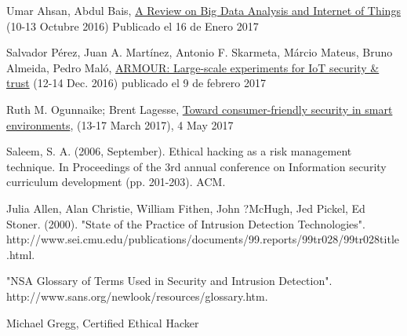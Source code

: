 \documentclass[a4paper,english,11pt]{article}
\begin{document}
\begin{thebibliography}{9}
		Umar Ahsan, Abdul Bais, \href{http://ieeexplore.ieee.org/stamp/stamp.jsp?arnumber=7815042&tag=1}{A Review on Big Data Analysis and Internet of Things} (10-13 Octubre 2016) Publicado el 16 de Enero 2017
		
		Salvador Pérez, Juan A. Martínez, Antonio F. Skarmeta, Márcio Mateus, Bruno Almeida, Pedro Maló, \href{http://ieeexplore.ieee.org/document/7845504/}{ARMOUR: Large-scale experiments for IoT security \& trust}
		(12-14 Dec. 2016) publicado el 9 de febrero 2017
		
		Ruth M. Ogunnaike; Brent Lagesse, \href{http://ieeexplore.ieee.org/document/7917633/}{Toward consumer-friendly security in smart environments}, (13-17 March 2017), 4 May 2017
		
		Saleem, S. A. (2006, September). Ethical hacking as a risk management technique. In Proceedings of the 3rd annual conference on Information security curriculum development (pp. 201-203). ACM.
		
	    Julia Allen, Alan Christie, William Fithen, John ?McHugh, Jed Pickel, Ed Stoner. (2000). "State of the Practice of Intrusion Detection Technologies". http://www.sei.cmu.edu/publications/documents/99.reports/99tr028/99tr028title.html.
	    
        "NSA Glossary of Terms Used in Security and Intrusion Detection". http://www.sans.org/newlook/resources/glossary.htm.
        
         Michael Gregg, Certified Ethical Hacker
	\end{thebibliography}
	
\end{document}
